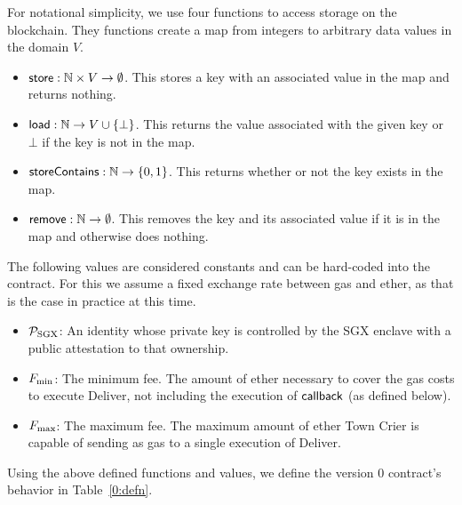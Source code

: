 For notational simplicity, we use four functions to access storage on the blockchain.
They functions create a map from integers to arbitrary data values in the domain $V$.
\begin{itemize}
  \item {${\sf store} : \mathbb{N} \times V \to \emptyset$.}
    This stores a key with an associated value in the map and returns nothing.

  \item {${\sf load} : \mathbb{N} \to V \cup \{\bot\}$.}
    This returns the value associated with the given key or $\bot$ if the key is not in the map.

  \item {${\sf storeContains} : \mathbb{N} \to \{0, 1\}$.}
    This returns whether or not the key exists in the map.

  \item {${\sf remove} : \mathbb{N} \to \emptyset$.}
    This removes the key and its associated value if it is in the map and otherwise does nothing.
\end{itemize}
The following values are considered constants and can be hard-coded into the contract.
For this we assume a fixed exchange rate between gas and ether, as that is the case in practice at this time.
\begin{itemize}
  \item $\mathcal{P}_{\rm SGX}$: An identity whose private key is controlled by the SGX enclave with a public attestation to that ownership.

  \item $F_{\rm min}$: The minimum fee. The amount of ether necessary to cover the gas costs to execute Deliver, not including the execution of ${\sf callback}$ (as defined below).

  \item $F_{\rm max}$: The maximum fee. The maximum amount of ether Town Crier is capable of sending as gas to a single execution of Deliver.
\end{itemize}
Using the above defined functions and values, we define the version 0 contract's behavior in Table~\ref{0:defn}.


